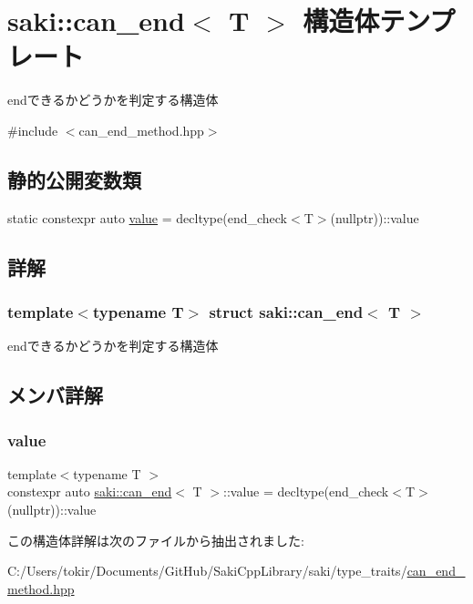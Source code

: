 \hypertarget{structsaki_1_1can__end}{}\section{saki\+:\+:can\+\_\+end$<$ T $>$ 構造体テンプレート}
\label{structsaki_1_1can__end}


endできるかどうかを判定する構造体  




{\ttfamily \#include $<$can\+\_\+end\+\_\+method.\+hpp$>$}

\subsection*{静的公開変数類}
\begin{DoxyCompactItemize}
\item 
static constexpr auto \mbox{\hyperlink{structsaki_1_1can__end_a5448d219fb1809d8e1bb40ffe2361056}{value}} = decltype(end\+\_\+check$<$T$>$(nullptr))\+::value
\end{DoxyCompactItemize}


\subsection{詳解}
\subsubsection*{template$<$typename T$>$\newline
struct saki\+::can\+\_\+end$<$ T $>$}

endできるかどうかを判定する構造体 

\subsection{メンバ詳解}
\mbox{\label{structsaki_1_1can__end_a5448d219fb1809d8e1bb40ffe2361056}} 
\subsubsection{\texorpdfstring{value}{value}}
{\footnotesize\ttfamily template$<$typename T $>$ \\
constexpr auto \mbox{\hyperlink{structsaki_1_1can__end}{saki\+::can\+\_\+end}}$<$ T $>$\+::value = decltype(end\+\_\+check$<$T$>$(nullptr))\+::value\hspace{0.3cm}{\ttfamily [static]}}



この構造体詳解は次のファイルから抽出されました\+:\begin{DoxyCompactItemize}
\item 
C\+:/\+Users/tokir/\+Documents/\+Git\+Hub/\+Saki\+Cpp\+Library/saki/type\+\_\+traits/\mbox{\hyperlink{can__end__method_8hpp}{can\+\_\+end\+\_\+method.\+hpp}}\end{DoxyCompactItemize}
